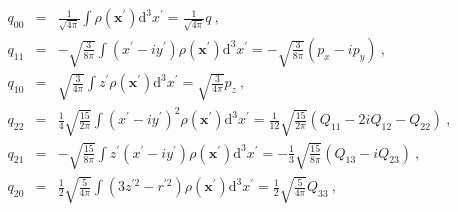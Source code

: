 \documentclass[12pt,a4paper]{article}
\renewcommand{\vec}[1]{\boldsymbol{#1}}
\newcommand{\dif}{\mathrm{d}}
\begin{document}
\begin{eqnarray*}
q_{00} &=& \frac{1}{\sqrt{4\pi}} \int \rho(\vec{x}^\prime) \dif^3 x^\prime = \frac{1}{\sqrt{4\pi}} q ~, \\
q_{11} &=& -\sqrt{\frac{3}{8\pi}} \int (x^\prime -i y^\prime)\rho(\vec{x}^\prime) \dif^3 x^\prime = -\sqrt{\frac{3}{8\pi}} (p_x -ip_y) ~, \\
q_{10} &=& \sqrt{\frac{3}{4\pi}} \int z^\prime \rho(\vec{x}^\prime) \dif^3 x^\prime = \sqrt{\frac{3}{4\pi}} p_z ~, \\
q_{22} &=& \frac{1}{4}\sqrt{\frac{15}{2\pi}} \int (x^\prime -i y^\prime)^2 \rho(\vec{x}^\prime) \dif^3 x^\prime = \frac{1}{12} \sqrt{\frac{15}{2\pi}} (Q_{11} -2iQ_{12} -Q_{22}) ~, \\
q_{21} &=& -\sqrt{\frac{15}{8\pi}} \int z^\prime(x^\prime -i y^\prime)\rho(\vec{x}^\prime) \dif^3 x^\prime = -\frac{1}{3}\sqrt{\frac{15}{8\pi}} (Q_{13} -iQ_{23}) ~, \\
q_{20} &=& \frac{1}{2}\sqrt{\frac{5}{4\pi}} \int (3z^{\prime 2} - r^{\prime 2})\rho(\vec{x}^\prime) \dif^3 x^\prime = \frac{1}{2}\sqrt{\frac{5}{4\pi}} Q_{33} ~, 
\end{eqnarray*}
\end{document}
